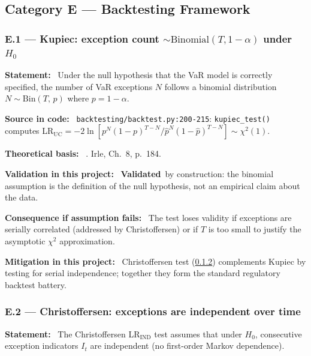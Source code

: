 \documentclass[11pt,a4paper]{article}
\newcommand{\asmfield}[1]{\medskip\noindent\textbf{#1:}\ }
\newcommand{\code}[1]{\texttt{#1}}
\newcommand{\validated}{\textbf{Validated}}
\begin{document}
\subsection{Category E --- Backtesting Framework}\label{sec:catE}

\subsubsection{E.1 --- Kupiec: exception count $\sim \mathrm{Binomial}(T, 1-\alpha)$ under $H_0$}\label{asm:E1}

\asmfield{Statement}
Under the null hypothesis that the VaR model is correctly specified,
the number of VaR exceptions $N$ follows a binomial distribution
$N \sim \mathrm{Bin}(T,\, p)$ where $p = 1 - \alpha$.

\asmfield{Source in code}
\code{backtesting/backtest.py:200-215}: \code{kupiec\_test()} computes
LR$_{\mathrm{UC}} = -2\ln[p^N(1-p)^{T-N} / \hat{p}^N(1-\hat{p})^{T-N}] \sim \chi^2(1)$.

\asmfield{Theoretical basis}
\cite{Kupiec1995}. Irle, Ch.~8, p.~184.

\asmfield{Validation in this project}
\validated\ by construction: the binomial assumption is the definition of
the null hypothesis, not an empirical claim about the data.

\asmfield{Consequence if assumption fails}
The test loses validity if exceptions are serially correlated (addressed by
Christoffersen) or if $T$ is too small to justify the asymptotic $\chi^2$
approximation.

\asmfield{Mitigation in this project}
Christoffersen test (\cref{asm:E2}) complements Kupiec by testing for
serial independence; together they form the standard regulatory backtest
battery.

\subsubsection{E.2 --- Christoffersen: exceptions are independent over time}\label{asm:E2}

\asmfield{Statement}
The Christoffersen LR$_{\mathrm{IND}}$ test assumes that under $H_0$,
consecutive exception indicators $I_t$ are independent (no first-order
Markov dependence).
\end{document}
